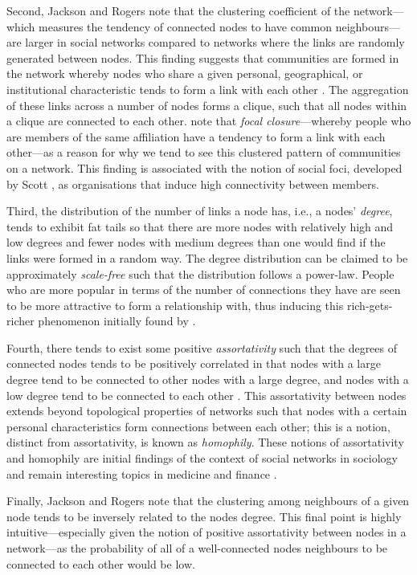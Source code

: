 Second, Jackson and Rogers note that the clustering coefficient of the network---which measures the tendency of connected nodes to have common neighbours---are larger in social networks compared to networks where the links are randomly generated between nodes. This finding suggests that communities are formed in the network whereby nodes who share a given personal, geographical, or institutional characteristic tends to form a link with each other \citep{Watts2002}. The aggregation of these links across a number of nodes forms a clique, such that all nodes within a clique are connected to each other. \citet{KossinetsWatts2006} note that \emph{focal closure}---whereby people who are members of the same affiliation have a tendency to form a link with each other---as a reason for why we tend to see this clustered pattern of communities on a network. This finding is associated with the notion of social foci, developed by Scott \citet{Feld1981, Feld1982}, as organisations that induce high connectivity between members.

Third, the distribution of the number of links a node has, i.e., a nodes' \emph{degree}, tends to exhibit fat tails so that there are more nodes with relatively high and low degrees and fewer nodes with medium degrees than one would find if the links were formed in a random way. The degree distribution can be claimed to be approximately \emph{scale-free} such that the distribution follows a power-law. People who are more popular in terms of the number of connections they have are seen to be more attractive to form a relationship with, thus inducing this rich-gets-richer phenomenon initially found by \citet{Simon1955}.

Fourth, there tends to exist some positive \emph{assortativity} such that the degrees of connected nodes tends to be positively correlated in that nodes with a large degree tend to be connected to other nodes with a large degree, and nodes with a low degree tend to be connected to each other \citep{Newman2003mixing}. This assortativity between nodes extends beyond topological properties of networks such that nodes with a certain personal characteristics form connections between each other; this is a notion, distinct from assortativity, is known as \emph{homophily}. These notions of assortativity and homophily are initial findings of the context of social networks in sociology \citep{McPherson2001} and remain interesting topics in medicine and finance \citep{Haldane2009, HaldaneMay2011}.

Finally, Jackson and Rogers note that the clustering among neighbours of a given node tends to be inversely related to the nodes degree. This final point is highly intuitive---especially given the notion of positive assortativity between nodes in a network---as the probability of all of a well-connected nodes neighbours to be connected to each other would be low.

